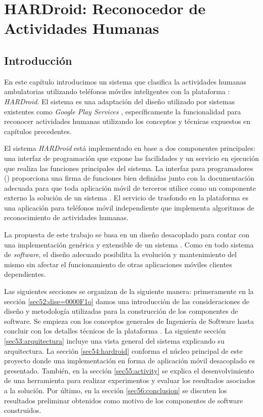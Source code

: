 
\chapter{HARDroid: Reconocedor de Actividades Humanas}

\label{chap5:hardroid}

\section{Introducción}

\label{sec51:intro}En este capítulo introducimos un sistema que clasifica
la actividades humanas ambulatorias utilizando teléfonos móviles inteligentes
con la plataforma \texttrademark: \emph{HARDroid}.
El sistema es una adaptación del diseño utilizado por sistemas existentes
como \emph{Google Play Services} \cite{Google2013l}, específicamente
la funcionalidad para reconocer actividades humanas utilizando los
conceptos y técnicas expuestos en capítulos precedentes. 

El sistema \emph{HARDroid} está implementado en base a dos componentes
principales: una interfaz de programación que expone las facilidades
y un servicio en ejecución que realiza las funciones principales del
sistema. La interfaz para programadores () proporciona
una firma de funciones bien definidas junto con la documentación adecuada
para que toda aplicación móvil de terceros utilice como un componente
externo la solución de un sistema . El servicio de trasfondo
en la plataforma  es una aplicación para teléfonos
móvil independiente que implementa algoritmos de reconocimiento de
actividades humanas.

La propuesta de este trabajo se basa en un diseño desacoplado para
contar con una implementación genérica y extensible de un sistema
. Como en todo sistema de \emph{software}, el diseño adecuado
posibilita la evolución y mantenimiento del mismo sin afectar el funcionamiento
de otras aplicaciones móviles clientes dependientes. 

Las siguientes secciones se organizan de la siguiente manera: primeramente
en la sección \ref{sec52:dise=0000F1o} damos una introducción de
las consideraciones de diseño y metodología utilizadas para la construcción
de los componentes de software. Se empieza con los conceptos generales
de Ingeniería de Software hasta concluir con los detalles técnicos
de la plataforma . La siguiente sección \ref{sec53:arquitectura}
incluye una vista general del sistema explicando su arquitectura.
La sección \ref{sec54:hardroid} conforma el núcleo principal de este
proyecto donde una implementación  en forma de aplicación
móvil desacoplado es presentado. También, en la sección \ref{sec55:activity}
se explica el desenvolvimiento de una herramienta para realizar experimentos
y evaluar los resultados asociados a la solución. Por último, en la
sección \ref{sec56:conclusion} se discuten los resultados preliminar
obtenidos como motivo de los componentes de software construidos.

